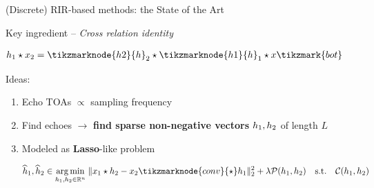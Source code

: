 \begin{frame}{(Discrete) RIR-based methods: the State of the Art \hfill\faBook}
\begin{block}{Key ingredient -- \textit{Cross relation identity}}
{\begin{equation*}
\begin{aligned}
                \discRIR_1 \discConv \discMic_2 &= \tikzmarknode{h2}{\discRIR}_2 \discConv \tikzmarknode{h1}{\discRIR}_1 \discConv \discSrc\tikzmark{bot}
             \end{aligned}
        \end{equation*}
        }


    \end{block}

    \begin{block}{Ideas:}
    \begin{enumerate}
        \small
        \item Echo TOAs $\propto$ sampling frequency
        \item Find echoes $\rightarrow$ \textbf{find sparse non-negative vectors} $h_1, h_2$ of length $L$
        \item Modeled as \textbf{Lasso}-like problem

        \vspace*{2mm}
        \begin{mysotablock}
            \begin{equation*}
                \widehat{\discRIR}_1, \widehat{\discRIR}_2 \in
                \underset{\discRIR_1, \discRIR_2\in\kR^n}{\arg\min}\;
                \Vert \discMic_1 \discConv \discRIR_2 - \discMic_2 \tikzmarknode{conv}{\discConv} \discRIR_1 \Vert_2^2
                + \lambda \mathcal{P}(\discRIR_1, \discRIR_2)
                \quad\text{s.t.}\quad\mathcal{C}(\discRIR_1, \discRIR_2)
            \end{equation*}


\end{mysotablock}
\end{enumerate}
\end{block}
\end{frame}
